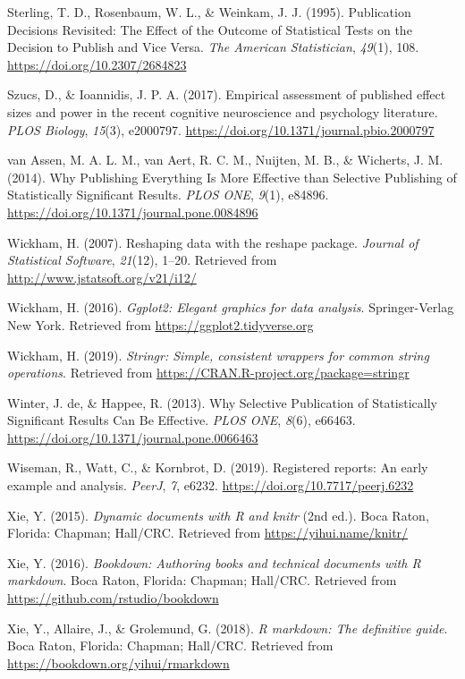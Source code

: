 \documentclass[british,,jou,floatsintext]{apa6}
\begin{document}
\leavevmode\hypertarget{ref-Sterling1995}{}%
Sterling, T. D., Rosenbaum, W. L., \& Weinkam, J. J. (1995). Publication Decisions Revisited: The Effect of the Outcome of Statistical Tests on the Decision to Publish and Vice Versa. \emph{The American Statistician}, \emph{49}(1), 108. \url{https://doi.org/10.2307/2684823}

\leavevmode\hypertarget{ref-Szucs2017}{}%
Szucs, D., \& Ioannidis, J. P. A. (2017). Empirical assessment of published effect sizes and power in the recent cognitive neuroscience and psychology literature. \emph{PLOS Biology}, \emph{15}(3), e2000797. \url{https://doi.org/10.1371/journal.pbio.2000797}

\leavevmode\hypertarget{ref-vanAssen2014}{}%
van Assen, M. A. L. M., van Aert, R. C. M., Nuijten, M. B., \& Wicherts, J. M. (2014). Why Publishing Everything Is More Effective than Selective Publishing of Statistically Significant Results. \emph{PLOS ONE}, \emph{9}(1), e84896. \url{https://doi.org/10.1371/journal.pone.0084896}

\leavevmode\hypertarget{ref-R-reshape2}{}%
Wickham, H. (2007). Reshaping data with the reshape package. \emph{Journal of Statistical Software}, \emph{21}(12), 1--20. Retrieved from \url{http://www.jstatsoft.org/v21/i12/}

\leavevmode\hypertarget{ref-R-ggplot2}{}%
Wickham, H. (2016). \emph{Ggplot2: Elegant graphics for data analysis}. Springer-Verlag New York. Retrieved from \url{https://ggplot2.tidyverse.org}

\leavevmode\hypertarget{ref-R-stringr}{}%
Wickham, H. (2019). \emph{Stringr: Simple, consistent wrappers for common string operations}. Retrieved from \url{https://CRAN.R-project.org/package=stringr}

\leavevmode\hypertarget{ref-Winter2013}{}%
Winter, J. de, \& Happee, R. (2013). Why Selective Publication of Statistically Significant Results Can Be Effective. \emph{PLOS ONE}, \emph{8}(6), e66463. \url{https://doi.org/10.1371/journal.pone.0066463}

\leavevmode\hypertarget{ref-Wiseman2019}{}%
Wiseman, R., Watt, C., \& Kornbrot, D. (2019). Registered reports: An early example and analysis. \emph{PeerJ}, \emph{7}, e6232. \url{https://doi.org/10.7717/peerj.6232}

\leavevmode\hypertarget{ref-R-knitr}{}%
Xie, Y. (2015). \emph{Dynamic documents with R and knitr} (2nd ed.). Boca Raton, Florida: Chapman; Hall/CRC. Retrieved from \url{https://yihui.name/knitr/}

\leavevmode\hypertarget{ref-R-bookdown}{}%
Xie, Y. (2016). \emph{Bookdown: Authoring books and technical documents with R markdown}. Boca Raton, Florida: Chapman; Hall/CRC. Retrieved from \url{https://github.com/rstudio/bookdown}

\leavevmode\hypertarget{ref-R-rmarkdown}{}%
Xie, Y., Allaire, J., \& Grolemund, G. (2018). \emph{R markdown: The definitive guide}. Boca Raton, Florida: Chapman; Hall/CRC. Retrieved from \url{https://bookdown.org/yihui/rmarkdown}
\end{document}
